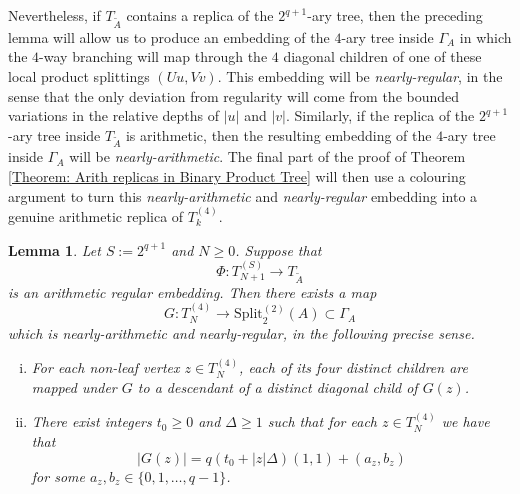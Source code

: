 \documentclass[11pt]{amsart}
\newcommand\labs[1]{\left\lvert#1\right\rvert}
\newcommand{\Split}{\mathrm{Split}}
\renewcommand{\geq}{\geqslant}
\theoremstyle{plain}
\newtheorem{lem}[thm]{Lemma}
\theoremstyle{definition}
\theoremstyle{remark}
\begin{document}
Nevertheless, if $T_{\tilde{A}}$ contains a replica of the $2^{q+1}$-ary tree, then the preceding lemma will allow us to produce an embedding of the $4$-ary tree inside $\Gamma_A$ in which the $4$-way branching will map through the $4$ diagonal children of one of these local product splittings $(Uu,Vv)$. This embedding will be \textit{nearly-regular}, in the sense that the only deviation from regularity will come from the bounded variations in the relative depths of $\labs{u}$ and $\labs{v}$.
Similarly, if the replica of the $2^{q+1}$-ary tree inside $T_{\tilde{A}}$ is arithmetic, then the resulting embedding of the $4$-ary tree inside $\Gamma_A$ will be \textit{nearly-arithmetic}. The final part of the proof of Theorem \ref{Theorem: Arith replicas in Binary Product Tree} will then use a colouring argument to turn this \textit{nearly-arithmetic} and \textit{nearly-regular} embedding into a genuine arithmetic replica of $T_k^{(4)}$.
\begin{lem}\label{Lem: S-ary tree in block tree gives nearly arithmetic 4-ary tree}
Let $S:=2^{q+1}$ and $N\geq 0$. Suppose that
\[ \Phi: T_{N+1}^{(S)} \to T_{\tilde{A}}\]
is an arithmetic regular embedding. Then there exists a map
\[ G: T_N^{(4)} \to \Split_2^{(2)}(A)\subset \Gamma_A\]
which is \textit{nearly-arithmetic} and \textit{nearly-regular}, in the following precise sense.
\begin{enumerate}[(i)]
\item For each non-leaf vertex $z \in T_N^{(4)}$, each of its four distinct children are mapped under $G$ to a descendant of a distinct diagonal child of $G(z)$.
\item There exist integers $t_0\geq 0$ and $\Delta\geq 1$ such that for each $z \in T_N^{(4)}$ we have that
\[ \labs{G(z)} = q(t_0+\labs{z}\Delta)(1,1)+(a_z,b_z) \] 
for some $a_z,b_z \in \{0,1,\ldots,q-1\}$.
\end{enumerate}
\end{lem}
\end{document}
